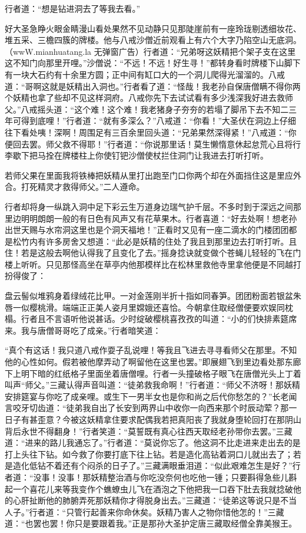 \documentclass[12pt,UTF8]{ctexbook}
\begin{document}
{	行者道：“想是钻进洞去了等我去看。”
	
	好大圣急睁火眼金睛漫山看处果然不见动静只见那陡崖前有一座玲珑剔透细妆花、堆五采、三檐四簇的牌楼。他与八戒沙僧近前观看上有六个大字乃陷空山无底洞。（wwW.mianhuatang.la 无弹窗广告）行者道：“兄弟呀这妖精把个架子支在这里这不知门向那里开哩。”沙僧说：“不远！不远！好生寻！”都转身看时牌楼下山脚下有一块大石约有十余里方圆；正中间有缸口大的一个洞儿爬得光溜溜的。八戒道：“哥啊这就是妖精出入洞也。”行者看了道：“怪哉！我老孙自保唐僧瞒不得你两个妖精也拿了些却不见这样洞府。八戒你先下去试试看有多少浅深我好进去救师父。”八戒摇头道：“这个难！这个难！我老猪身子夯夯的若塌了脚吊下去不知二三年可得到底哩！”行者道：“就有多深么？”八戒道：“你看！”大圣伏在洞边上仔细往下看处咦！深啊！周围足有三百余里回头道：“兄弟果然深得紧！”八戒道：“你便回去罢。师父救不得耶！”行者道：“你说那里话！莫生懒惰意休起怠荒心且将行李歇下把马拴在牌楼柱上你使钉钯沙僧使杖拦住洞门让我进去打听打听。
	
	若师父果在里面我将铁棒把妖精从里打出跑至门口你两个却在外面挡住这是里应外合。打死精灵才救得师父。”二人遵命。
	
	行者却将身一纵跳入洞中足下彩云生万道身边瑞气护千层。不多时到于深远之间那里边明明朗朗一般的有日色有风声又有花草果木。行者喜道：“好去处啊！想老孙出世天赐与水帘洞这里也是个洞天福地！”正看时又见有一座二滴水的门楼团团都是松竹内有许多房舍又想道：“此必是妖精的住处了我且到那里边去打听打听。且住！若是这般去啊他认得我了且变化了去。”摇身捻诀就变做个苍蝇儿轻轻的飞在门楼上听听。只见那怪高坐在草亭内他那模样比在松林里救他寺里拿他便是不同越打扮得俊了：
	
	盘云髻似堆鸦身着绿绒花比甲。一对金莲刚半折十指如同春笋。团团粉面若银盆朱唇一似樱桃滑。端端正正美人姿月里嫦娥还喜恰。今朝拿住取经僧便要欢娱同枕榻。行者且不言语听他说甚话。少时绽破樱桃喜孜孜的叫道：“小的们快排素筵席来。我与唐僧哥哥吃了成亲。”行者暗笑道：
	
	“真个有这话！我只道八戒作耍子乱说哩！等我且飞进去寻寻看师父在那里。不知他的心性如何。假若被他摩弄动了啊留他在这里也罢。”即展翅飞到里边看处那东廊下上明下暗的红纸格子里面坐着唐僧哩。行者一头撞破格子眼飞在唐僧光头上丁着叫声“师父。”三藏认得声音叫道：“徒弟救我命啊！”行者道：“师父不济呀！那妖精安排筵宴与你吃了成亲哩。或生下一男半女也是你和尚之后代你愁怎的？”长老闻言咬牙切齿道：“徒弟我自出了长安到两界山中收你一向西来那个时辰动荤？那一日子有甚歪意？今被这妖精拿住要求配偶我若把真阳丧了我就身堕轮回打在那阴山背后永世不得翻身！”行者笑道：“莫誓既有真心往西天取经老孙带你去罢。”三藏道：“进来的路儿我通忘了。”行者道：“莫说你忘了。他这洞不比走进来走出去的是打上头往下钻。如今救了你要打底下往上钻。若是造化高钻着洞口儿就出去了；若是造化低钻不着还有个闷杀的日子了。”三藏满眼垂泪道：“似此艰难怎生是好？”行者道：“没事！没事！那妖精整治酒与你吃没奈何也吃他一锺；只要斟得急些儿斟起一个喜花儿来等我变作个蟭蟟虫儿飞在酒泡之下他把我一口吞下肚去我就捻破他的心肝扯断他的肺腑弄死那妖精你才得脱身出去。”三藏道：“徒弟这等说只是不当人子。”行者道：“只管行起善来你命休矣。妖精乃害人之物你惜他怎的！”三藏道：“也罢也罢！你只是要跟着我。”正是那孙大圣护定唐三藏取经僧全靠美猴王。
	
}
\end{document}
